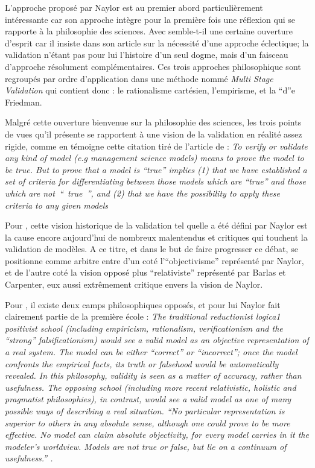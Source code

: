 L'approche proposé par Naylor est au premier abord particulièrement intéressante car son approche intègre pour la première fois une réflexion qui se rapporte à la philosophie des sciences. Avec semble-t-il une certaine ouverture d'esprit car il insiste dans son article sur la nécessité d'une approche éclectique; la validation n'étant pas pour lui l'histoire d'un seul dogme, mais d'un faisceau d'approche résolument complémentaires. Ces trois approches philosophique sont regroupés par ordre d'application dans une méthode nommé \textit{Multi Stage Validation} qui contient donc : le rationalisme cartésien, l'empirisme, et la \foreignquote{positive economics} de Friedman.

Malgré cette ouverture bienvenue sur la philosophie des sciences, les trois points de vues qu'il présente se rapportent à une vision de la validation en réalité assez rigide, comme en témoigne cette citation tiré de l'article de \textcite{Naylor1967} : \textit{To verify or validate any kind of model (e.g management science models) means to prove the model to be true. But to prove that a model is \enquote{true} implies (1) that we have established a set of criteria for differentiating between those models which are \enquote{true} and those which are not \enquote{ true }, and (2) that we have the possibility to apply these criteria to any given models} 

Pour \textcite{Kleindorfer1998}, cette vision historique de la validation tel quelle a été défini par Naylor est la cause encore aujourd'hui de nombreux malentendus et critiques qui touchent la validation de modèles. A ce titre, et dans le but de faire progresser ce débat, \textcite{Kleindorfer1998} se positionne comme arbitre entre d'un coté l'\enquote{objectivisme} représenté par Naylor, et de l'autre coté la vision opposé plus \enquote{relativiste} représenté par Barlas et Carpenter, eux aussi extrêmement critique envers la vision de Naylor.

Pour \textcite{Barlas1990, Barlas1996}, il existe deux camps philosophiques opposés, et pour lui Naylor fait clairement partie de la première école : \textit{The traditional reductionist logica1 positivist school (including empiricism, rationalism, verificationism and the “strong” falsificationism) would see a valid model as an objective representation of a real system. The model can be either “correct” or “incorrect”; once the model confronts the empirical facts, its truth or falsehood would be automatically revealed. In this philosophy, validity is seen as a matter of accuracy, rather than usefulness. The opposing school (including more recent relativistic, holistic and pragmatist philosophies), in contrast, would see a valid model as one of many possible ways of describing a real situation. “No particular representation is superior to others in any absolute sense, although one could prove to be more effective. No model can claim absolute objectivity, for every model carries in it the modeler’s worldview. Models are not true or false, but lie on a continuum of usefulness.” \autocite{Barlas1990}.}

